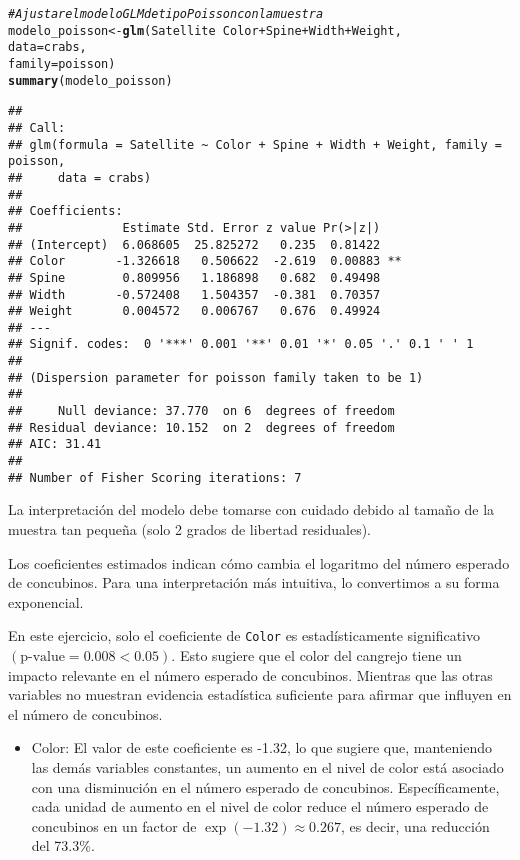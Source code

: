 \documentclass[paper=letter, fontsize=11pt, draft=false]{scrartcl}\usepackage[]{graphicx}\usepackage[]{xcolor}
\makeatletter
\newcommand{\hlcom}[1]{\textcolor[rgb]{0.678,0.584,0.686}{\textit{#1}}}%
\newcommand{\hlopt}[1]{\textcolor[rgb]{0,0,0}{#1}}%
\newcommand{\hldef}[1]{\textcolor[rgb]{0.345,0.345,0.345}{#1}}%
\newcommand{\hlkwb}[1]{\textcolor[rgb]{0.69,0.353,0.396}{#1}}%
\newcommand{\hlkwc}[1]{\textcolor[rgb]{0.333,0.667,0.333}{#1}}%
\newcommand{\hlkwd}[1]{\textcolor[rgb]{0.737,0.353,0.396}{\textbf{#1}}}%
\newenvironment{kframe}{%
 \def\at@end@of@kframe{}%
 \ifinner\ifhmode%
  \def\at@end@of@kframe{\end{minipage}}%
  \begin{minipage}{\columnwidth}%
 \fi\fi%
 \def\FrameCommand##1{\hskip\@totalleftmargin \hskip-\fboxsep
 \colorbox{shadecolor}{##1}\hskip-\fboxsep
     \hskip-\linewidth \hskip-\@totalleftmargin \hskip\columnwidth}%
 \MakeFramed {\advance\hsize-\width
   \@totalleftmargin\z@ \linewidth\hsize
   \@setminipage}}%
 {\par\unskip\endMakeFramed%
 \at@end@of@kframe}
\newenvironment{knitrout}{}{} %
\numberwithin{equation}{problemcounter} %
\numberwithin{figure}{problemcounter} %
\numberwithin{table}{problemcounter} %
\numberwithin{subsection}{problemcounter}
\makeatother
\begin{document}
\begin{knitrout}
\color{fgcolor}\begin{kframe}
\begin{alltt}
\hlcom{# Ajustar el modelo GLM de tipo Poisson con la muestra}
\hldef{modelo_poisson} \hlkwb{<-} \hlkwd{glm}\hldef{(Satellite} \hlopt{~} \hldef{Color} \hlopt{+} \hldef{Spine} \hlopt{+} \hldef{Width} \hlopt{+} \hldef{Weight,}
                             \hlkwc{data} \hldef{= crabs,}
                             \hlkwc{family} \hldef{= poisson)}
\hlkwd{summary}\hldef{(modelo_poisson)}
\end{alltt}
\begin{verbatim}
## 
## Call:
## glm(formula = Satellite ~ Color + Spine + Width + Weight, family = poisson, 
##     data = crabs)
## 
## Coefficients:
##              Estimate Std. Error z value Pr(>|z|)   
## (Intercept)  6.068605  25.825272   0.235  0.81422   
## Color       -1.326618   0.506622  -2.619  0.00883 **
## Spine        0.809956   1.186898   0.682  0.49498   
## Width       -0.572408   1.504357  -0.381  0.70357   
## Weight       0.004572   0.006767   0.676  0.49924   
## ---
## Signif. codes:  0 '***' 0.001 '**' 0.01 '*' 0.05 '.' 0.1 ' ' 1
## 
## (Dispersion parameter for poisson family taken to be 1)
## 
##     Null deviance: 37.770  on 6  degrees of freedom
## Residual deviance: 10.152  on 2  degrees of freedom
## AIC: 31.41
## 
## Number of Fisher Scoring iterations: 7
\end{verbatim}
\end{kframe}
\end{knitrout}

La interpretación del modelo debe tomarse con cuidado debido al tamaño de la muestra tan pequeña (solo 2 grados de libertad residuales).

Los coeficientes estimados indican cómo cambia el logaritmo del número esperado de concubinos. Para una interpretación más intuitiva, lo convertimos a su forma exponencial.

En este ejercicio, solo el coeficiente de \texttt{Color} es estadísticamente significativo $(\text{p-value} = 0.008 < 0.05)$. Esto sugiere que el color del cangrejo tiene un impacto relevante en el número esperado de concubinos. Mientras que las otras variables no muestran evidencia estadística suficiente para afirmar que influyen en el número de concubinos.

\begin{itemize}
    \item Color: El valor de este coeficiente es -1.32, lo que sugiere que, manteniendo las demás variables constantes, un aumento en el nivel de color está asociado con una disminución en el número esperado de concubinos. Específicamente, cada unidad de aumento en el nivel de color reduce el número esperado de concubinos en un factor de $\exp(-1.32) \approx 0.267$, es decir, una reducción del 73.3\%.
\end{itemize}
\end{document}
